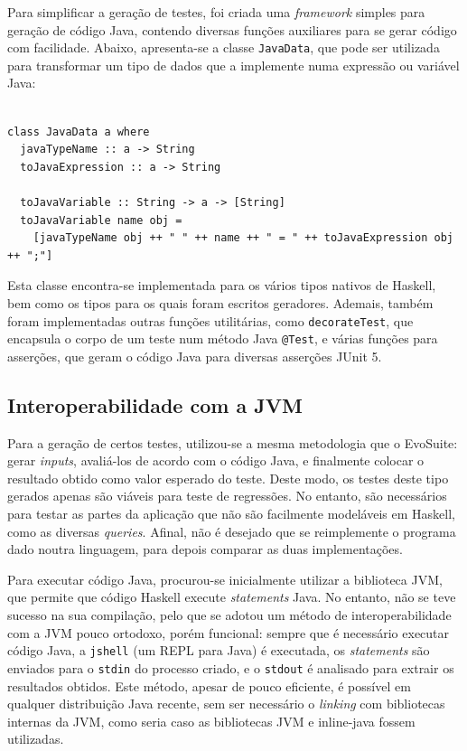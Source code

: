 \documentclass[12pt, a4paper]{article}
\begin{document}
Para simplificar a geração de testes, foi criada uma \emph{framework} simples para geração de código
Java, contendo diversas funções auxiliares para se gerar código com facilidade. Abaixo, apresenta-se
a classe \texttt{JavaData}, que pode ser utilizada para transformar um tipo de dados que a
implemente numa expressão ou variável Java:

\begin{lstlisting}

class JavaData a where
  javaTypeName :: a -> String
  toJavaExpression :: a -> String

  toJavaVariable :: String -> a -> [String]
  toJavaVariable name obj =
    [javaTypeName obj ++ " " ++ name ++ " = " ++ toJavaExpression obj ++ ";"]
\end{lstlisting}

Esta classe encontra-se implementada para os vários tipos nativos de Haskell, bem como os tipos para
os quais foram escritos geradores. Ademais, também foram implementadas outras funções utilitárias,
como \texttt{decorateTest}, que encapsula o corpo de um teste num método Java \texttt{@Test}, e
várias funções para asserções, que geram o código Java para diversas asserções JUnit 5.

\subsection{Interoperabilidade com a JVM}

Para a geração de certos testes, utilizou-se a mesma metodologia que o EvoSuite: gerar
\emph{inputs}, avaliá-los de acordo com o código Java, e finalmente colocar o resultado obtido como
valor esperado do teste. Deste modo, os testes deste tipo gerados apenas são viáveis para teste de
regressões. No entanto, são necessários para testar as partes da aplicação que não são facilmente
modeláveis em Haskell, como as diversas \emph{queries}. Afinal, não é desejado que se reimplemente o
programa dado noutra linguagem, para depois comparar as duas implementações.

Para executar código Java, procurou-se inicialmente utilizar a biblioteca JVM, que permite que
código Haskell execute \emph{statements} Java. No entanto, não se teve sucesso na sua compilação,
pelo que se adotou um método de interoperabilidade com a JVM pouco ortodoxo, porém funcional: sempre
que é necessário executar código Java, a \texttt{jshell} (um REPL para Java) é executada, os
\emph{statements} são enviados para o \texttt{stdin} do processo criado, e o \texttt{stdout} é
analisado para extrair os resultados obtidos. Este método, apesar de pouco eficiente, é possível em
qualquer distribuição Java recente, sem ser necessário o \emph{linking} com bibliotecas internas da
JVM, como seria caso as bibliotecas JVM e inline-java fossem utilizadas.
\end{document}
